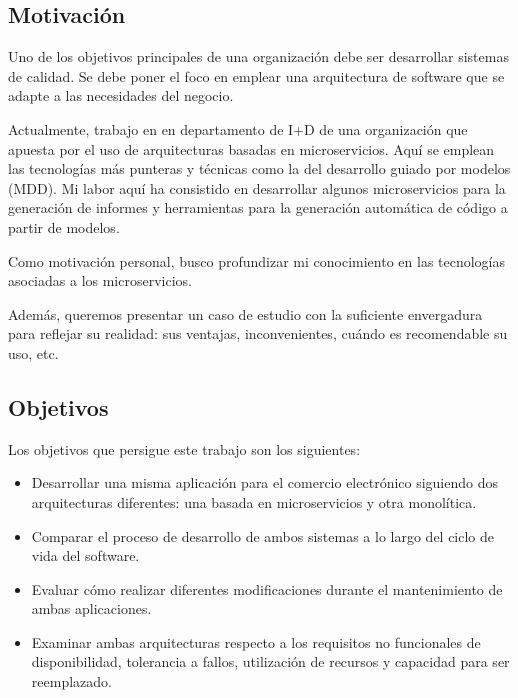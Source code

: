 \documentclass[11pt,a4paper]{article}
\begin{document}
\subsection{Motivación}

Uno de los objetivos principales de una organización debe ser desarrollar sistemas de calidad. Se debe poner el foco en emplear una arquitectura de software que se adapte a las necesidades del negocio.

Actualmente, trabajo en en departamento de I+D de una organización que apuesta por el uso de arquitecturas basadas en microservicios. Aquí se emplean las tecnologías más punteras y técnicas como la del desarrollo guiado por modelos (MDD). Mi labor aquí ha consistido en desarrollar algunos microservicios para la generación de informes y herramientas para la generación automática de código a partir de modelos. 

Como motivación personal, busco profundizar mi conocimiento en las tecnologías asociadas a los microservicios.

Además, queremos presentar un caso de estudio con la suficiente envergadura para reflejar su realidad: sus ventajas, inconvenientes, cuándo es recomendable su uso, etc.

\subsection{Objetivos}

Los objetivos que persigue este trabajo son los siguientes:

\begin{itemize}

\item Desarrollar una misma aplicación para el comercio electrónico siguiendo dos arquitecturas diferentes: una basada en microservicios y otra monolítica.

\item Comparar el proceso de desarrollo de ambos sistemas a lo largo del ciclo de vida del software.

\item Evaluar cómo realizar diferentes modificaciones durante el mantenimiento de ambas aplicaciones.

\item Examinar ambas arquitecturas respecto a los requisitos no funcionales de disponibilidad, tolerancia a fallos, utilización de recursos y capacidad para ser reemplazado.

\end{itemize}
\end{document}
